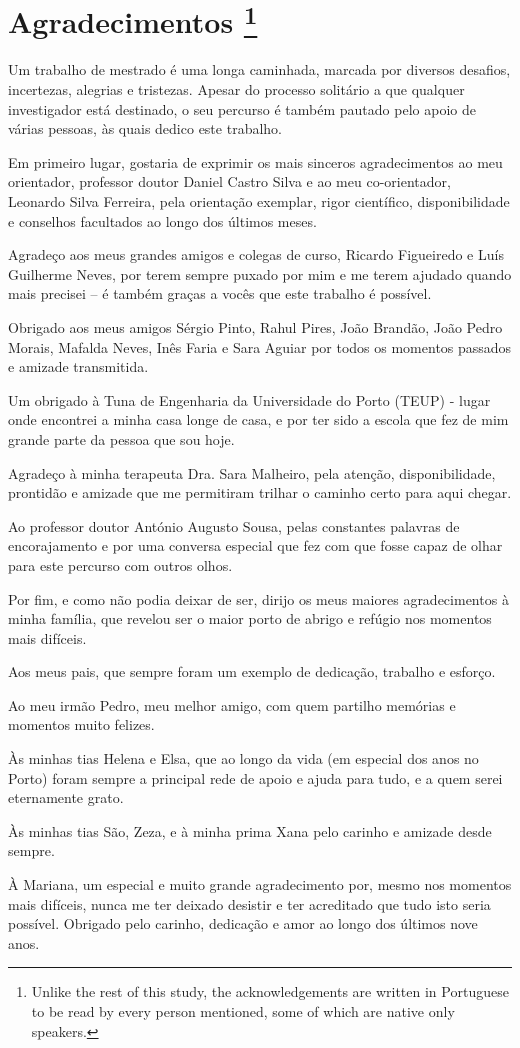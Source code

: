 \chapter*{Agradecimentos \footnote{Unlike the rest of this study, the acknowledgements are written in Portuguese to be read by every person mentioned, some of which are native only speakers.}}

Um trabalho de mestrado é uma longa caminhada, marcada por diversos desafios, incertezas, alegrias e tristezas. Apesar do processo solitário a que qualquer investigador está destinado, o seu percurso é também pautado pelo apoio de várias pessoas, às quais dedico este trabalho. 

Em primeiro lugar, gostaria de exprimir os mais sinceros agradecimentos ao meu orientador, professor doutor Daniel Castro Silva e ao meu co-orientador, Leonardo Silva Ferreira, pela orientação exemplar, rigor científico, disponibilidade e conselhos facultados ao longo dos últimos meses. 

Agradeço aos meus grandes amigos e colegas de curso, Ricardo Figueiredo e Luís Guilherme Neves, por terem sempre puxado por mim e me terem ajudado quando mais precisei – é também graças a vocês que este trabalho é possível. 

Obrigado aos meus amigos Sérgio Pinto, Rahul Pires, João Brandão, João Pedro Morais, Mafalda Neves, Inês Faria e Sara Aguiar por todos os momentos passados e amizade transmitida.  

Um obrigado à Tuna de Engenharia da Universidade do Porto (TEUP) - lugar onde encontrei a minha casa longe de casa, e por ter sido a escola que fez de mim grande parte da pessoa que sou hoje. 

Agradeço à minha terapeuta Dra. Sara Malheiro, pela atenção, disponibilidade, prontidão e amizade que me permitiram trilhar o caminho certo para aqui chegar. 

Ao professor doutor António Augusto Sousa, pelas constantes palavras de encorajamento e por uma conversa especial que fez com que fosse capaz de olhar para este percurso com outros olhos. 

Por fim, e como não podia deixar de ser, dirijo os meus maiores agradecimentos à minha família, que revelou ser o maior porto de abrigo e refúgio nos momentos mais difíceis.  

Aos meus pais, que sempre foram um exemplo de dedicação, trabalho e esforço. 

Ao meu irmão Pedro, meu melhor amigo, com quem partilho memórias e momentos muito felizes.  

Às minhas tias Helena e Elsa, que ao longo da vida (em especial dos anos no Porto) foram sempre a principal rede de apoio e ajuda para tudo, e a quem serei eternamente grato.  

Às minhas tias São, Zeza, e à minha prima Xana pelo carinho e amizade desde sempre.  

À Mariana, um especial e muito grande agradecimento por, mesmo nos momentos mais difíceis, nunca me ter deixado desistir e ter acreditado que tudo isto seria possível. Obrigado pelo carinho, dedicação e amor ao longo dos últimos nove anos.  
\vspace{10mm}
